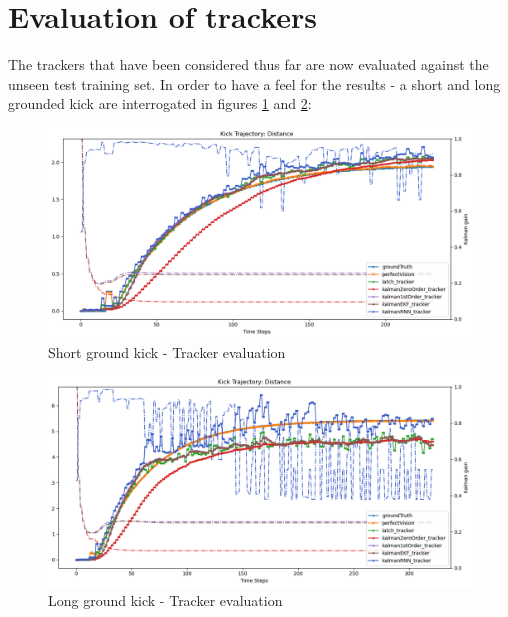 \documentclass[a4paper,twoside,12pt]{report}
\begin{document}
\section{Evaluation of trackers}

The trackers that have been considered thus far are now evaluated against the unseen test training set. In order to have a feel for the results - a short and long grounded kick are interrogated in figures \ref{fig:evalgroundshort} and \ref{fig:evalgroundlong}:

\begin{figure}[h!]
\begin{center}
\includegraphics[width=12cm]{images/eval_ground_short.png}
\caption{Short ground kick - Tracker evaluation}
\label{fig:evalgroundshort}
\end{center}
\end{figure}

\begin{figure}[h!]
\begin{center}
\includegraphics[width=12cm]{images/eval_ground_long.png}
\caption{Long ground kick - Tracker evaluation}
\label{fig:evalgroundlong}
\end{center}
\end{figure}

\end{document}
